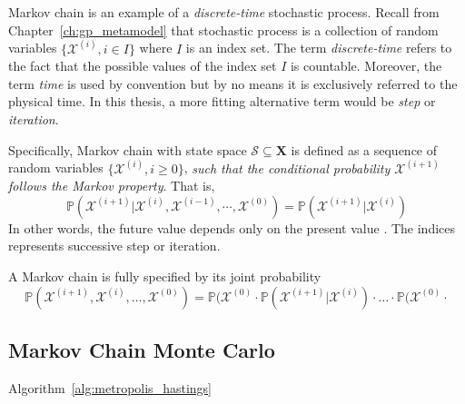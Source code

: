 Markov chain is an example of a \emph{discrete-time} stochastic process.
Recall from Chapter~\ref{ch:gp_metamodel} that stochastic process is a collection of random variables $\{\mathcal{X}^{(i)}, i \in I\}$ where $I$ is an index set.
The term \emph{discrete-time} refers to the fact that the possible values of the index set $I$ is countable.
Moreover, the term \emph{time} is used by convention but by no means it is exclusively referred to the physical time.
In this thesis, a more fitting alternative term would be \emph{step} or \emph{iteration}. 

Specifically, Markov chain with state space $\mathcal{S} \subseteq \mathbf{X}$ is defined as a sequence of random variables $\{\mathcal{X}^{(i)}, i \geq 0\}$,
\emph{such that the conditional probability $\mathcal{X}^{(i+1)}$ follows the Markov property}.
That is,
\begin{equation}
  \mathbb{P}(\mathcal{X}^{(i+1)} | \mathcal{X}^{(i)}, \mathcal{X}^{(i-1)}, \cdots, \mathcal{X}^{(0)}) = \mathbb{P}(\mathcal{X}^{(i+1)} | \mathcal{X}^{(i)})
\label{eq:markov_property}
\end{equation}
In other words, the future value depends only on the present value \cite{Geyer2011}.
The indices represents successive step or iteration.

A Markov chain is fully specified by its joint probability
\begin{equation}
  \mathbb{P}(\mathcal{X}^{(i+1)}, \mathcal{X}^{(i)}, \ldots, \mathcal{X}^{(0)}) = \mathbb{P}(\mathcal{X}^{(0)} \cdot \mathbb{P}(\mathcal{X}^{(i+1)} | \mathcal{X}^{(i)}) \cdot \ldots \cdot \mathbb{P}(\mathcal{X}^{(0)} \cdot
\label{eq:markov_property}
\end{equation}



\subsection{Markov Chain Monte Carlo}\label{sub:bc_mcmc_mcmc}


Algorithm~\ref{alg:metropolis_hastings}

